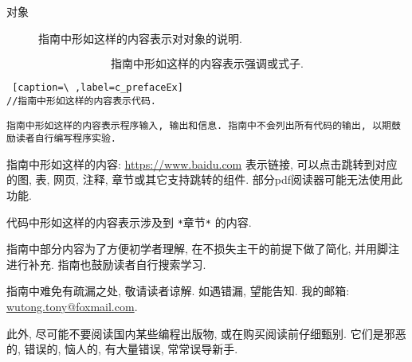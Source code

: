     \begin{description}
        \item[对象] 指南中形如这样的内容表示对对象的说明. 
    \end{description}

    \vspace*{-20pt}
        \[ \mbox{指南中形如这样的内容表示强调或式子.} \]

\begin{lstlisting} [caption=\ ,label=c_prefaceEx]
//指南中形如这样的内容表示代码.
\end{lstlisting}


\begin{lstlisting}
指南中形如这样的内容表示程序输入, 输出和信息. 指南中不会列出所有代码的输出, 以期鼓励读者自行编写程序实验.
\end{lstlisting}

    \vspace*{5pt}
    指南中形如这样的内容: \href{https://www.baidu.com}{https://www.baidu.com} 表示链接, 可以点击跳转到对应的图, 表, 网页, 注释, 章节或其它支持跳转的组件. 部分pdf阅读器可能无法使用此功能.

    \begin{mdframed}[linecolor=darkgray]
        代码中形如这样的内容表示涉及到 \texttt{*}章节\texttt{*} 的内容.
    \end{mdframed}

    指南中部分内容为了方便初学者理解, 在不损失主干的前提下做了简化, 并用脚注进行补充. 指南也鼓励读者自行搜索学习.

    指南中难免有疏漏之处, 敬请读者谅解. 如遇错漏, 望能告知. 我的邮箱: \mbox{\href{mailto: wutong.tony@foxmail.com}{wutong.tony@foxmail.com}}.

    此外, 尽可能不要阅读国内某些编程出版物, 或在购买阅读前仔细甄别. 它们是邪恶的, 错误的, 恼人的, 有大量错误, 常常误导新手.